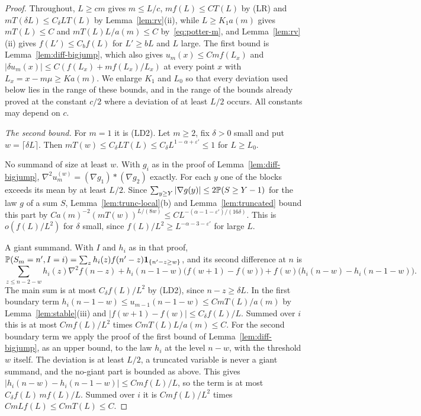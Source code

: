 \begin{proof}
Throughout, $L\ge cm$ gives $m\le L/c$, $mf(L)\le CT(L)$ by (LR) and $mT(\delta L)\le C_\delta LT(L)$
by Lemma~\ref{lem:rv}(ii), while $L\ge K_1a(m)$ gives $mT(L)\le C$ and $mT(L)L/a(m)\le C$
by~\eqref{eq:potter-m}, and Lemma~\ref{lem:rv}(ii) gives $f(L')\le C_bf(L)$ for $L'\ge bL$ and
$L$ large. The first bound is Lemma~\ref{lem:diff-bigjump}, which also gives
$u_m(x)\le Cmf(L_x)$ and $|\delta u_m(x)|\le C(f(L_x)+mf(L_x)/L_x)$ at every point $x$ with
$L_x=x-m\mu\ge Ka(m)$. We enlarge $K_1$ and $L_0$ so that every deviation used below lies in
the range of these bounds, and in the range of the bounds already proved at the constant
$c/2$ where a deviation of at least $L/2$ occurs. All constants may depend on $c$.

\emph{The second bound.} For $m=1$ it is (LD2). Let $m\ge2$, fix $\delta>0$ small and put
$w=\lceil\delta L\rceil$. Then $mT(w)\le C_\delta LT(L)\le C_\delta L^{1-\alpha+\varepsilon'}\le1$ for
$L\ge L_0$.

No summand of size at least $w$. With $g_i$ as in the proof of Lemma~\ref{lem:diff-bigjump},
$\nabla^2u^{(w)}_m=(\nabla g_1)*(\nabla g_2)$ exactly. For each $y$ one of the blocks exceeds its
mean by at least $L/2$. Since $\sum_{y\ge Y}|\nabla g(y)|\le2\mathbb{P}(S\ge Y-1)$ for the law $g$ of a
sum $S$, Lemma~\ref{lem:trunc-local}(b) and Lemma~\ref{lem:truncated} bound this part by
$Ca(m)^{-2}(mT(w))^{L/(8w)}\le CL^{-(\alpha-1-\varepsilon')/(16\delta)}$. This is $o(f(L)/L^2)$ for
$\delta$ small, since $f(L)/L^2\ge L^{-\alpha-3-\varepsilon'}$ for large $L$.

A giant summand. With $I$ and $h_i$ as in that proof,
$\mathbb{P}(S_m=n',I=i)=\sum_zh_i(z)f(n'-z)\mathbf{1}_{\{n'-z\ge w\}}$, and its second difference at $n$ is
\[
 \sum_{z\le n-2-w}h_i(z)\nabla^2f(n-z)+h_i(n-1-w)\bigl(f(w+1)-f(w)\bigr)+f(w)\bigl(h_i(n-w)-h_i(n-1-w)\bigr).
\]
The main sum is at most $C_\delta f(L)/L^2$ by (LD2), since $n-z\ge\delta L$. In the first
boundary term $h_i(n-1-w)\le u_{m-1}(n-1-w)\le CmT(L)/a(m)$ by Lemma~\ref{lem:stable}(iii) and
$|f(w+1)-f(w)|\le C_\delta f(L)/L$. Summed over $i$ this is at most $Cmf(L)/L^2$ times
$CmT(L)L/a(m)\le C$. For the second boundary term we apply the proof of the first bound of
Lemma~\ref{lem:diff-bigjump}, as an upper bound, to the law $h_i$ at the level $n-w$, with the
threshold $w$ itself. The deviation is at least $L/2$, a truncated variable is never a giant
summand, and the no-giant part is bounded as above. This gives
$|h_i(n-w)-h_i(n-1-w)|\le Cmf(L)/L$, so the term is at most $C_\delta f(L)\,mf(L)/L$. Summed over
$i$ it is $Cmf(L)/L^2$ times $CmLf(L)\le CmT(L)\le C$.


\end{proof}
